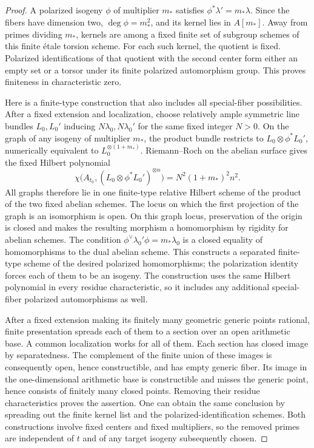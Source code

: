 \begin{proof}
A polarized isogeny $\phi$ of multiplier $m_*$ satisfies
$\phi^*\lambda'=m_*\lambda$.  Since the fibers have dimension two,
$\deg\phi=m_*^2$, and its kernel lies in $A[m_*]$.  Away from primes
dividing $m_*$, kernels are among a fixed finite set of subgroup schemes
of this finite \'etale torsion scheme.  For each such kernel, the
quotient is fixed.  Polarized identifications of that quotient with the
second center form either an empty set or a torsor under its finite
polarized automorphism group.  This proves finiteness in characteristic
zero.

Here is a finite-type construction that also includes all special-fiber
possibilities.  After a fixed extension and localization, choose
relatively ample symmetric line bundles $L_0,L_0'$ inducing
$N\lambda_0,N\lambda_0'$ for the same fixed integer $N>0$.  On the
graph of any isogeny of multiplier $m_*$, the product bundle restricts
to $L_0\otimes\phi^*L_0'$, numerically equivalent to
$L_0^{\otimes(1+m_*)}$.  Riemann--Roch on the abelian surface gives
the fixed Hilbert polynomial
\[
 \chi\bigl(A_{t_0},(L_0\otimes\phi^*L_0')^{\otimes n}\bigr)
   =N^2(1+m_*)^2 n^2.
\]
All graphs therefore lie in one finite-type relative Hilbert scheme
of the product of the two fixed abelian schemes.  The locus on which
the first projection of the graph is an isomorphism is open.  On this
graph locus, preservation of the origin is closed and makes the
resulting morphism a homomorphism by rigidity for abelian schemes.
The condition $\phi^\vee\lambda_0'\phi=m_*\lambda_0$ is a closed
equality of homomorphisms to the dual abelian scheme.  This constructs
a separated finite-type scheme of the desired polarized homomorphisms;
the polarization identity forces each of them to be an isogeny.
The construction uses the same Hilbert polynomial in every residue
characteristic, so it includes any additional special-fiber polarized
automorphisms as well.

After a fixed extension making its finitely many geometric generic
points rational, finite presentation spreads each of them to a section
over an open arithmetic base.  A common localization works for all
of them.  Each section has closed image by separatedness.  The
complement of the finite union of these images is consequently open,
hence constructible, and has empty generic fiber.
Its image in the one-dimensional arithmetic base is constructible
and misses the generic point, hence consists of finitely many closed
points.  Removing their residue characteristics proves the assertion.
One can obtain the same conclusion by spreading out the finite kernel
list and the polarized-identification schemes.  Both constructions
involve fixed centers and fixed multipliers, so the removed primes are
independent of $t$ and of any target isogeny subsequently chosen.
\end{proof}

